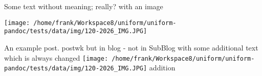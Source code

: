 \documentclass[a4paper,10pt]{scrbook}
\begin{document}
Some text without meaning; really? with an image

\texttt{[image: /home/frank/Workspace8/uniform/uniform-pandoc/tests/data/img/120-2026\_IMG.JPG]}

An example post. postwk but in blog - not in SubBlog with some
additional text which is always changed
\texttt{[image: /home/frank/Workspace8/uniform/uniform-pandoc/tests/data/img/120-2026\_IMG.JPG]}
addition

\printindex
\end{document}
